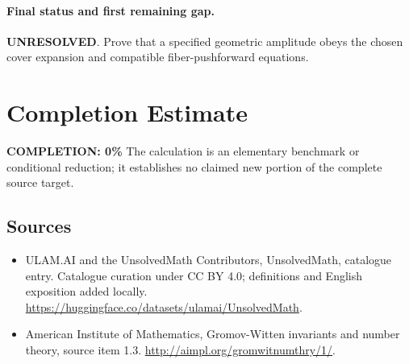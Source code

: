 \documentclass[11pt]{article}
\begin{document}
\paragraph{Final status and first remaining gap.}
\textbf{UNRESOLVED}. Prove that a specified geometric amplitude obeys the chosen cover expansion and compatible fiber-pushforward equations.

\section{Completion Estimate}
\noindent\textbf{COMPLETION: 0\%}
The calculation is an elementary benchmark or conditional reduction; it establishes no claimed new portion of the complete source target.

\subsection{Sources}
\begin{itemize}
\item[\hypertarget{source:statement:1}{S1}] ULAM.AI and the UnsolvedMath Contributors, UnsolvedMath, catalogue entry. Catalogue curation under CC BY 4.0; definitions and English exposition added locally.
\url{https://huggingface.co/datasets/ulamai/UnsolvedMath}.
\item[\hypertarget{source:statement:2}{S2}] American Institute of Mathematics, Gromov-Witten invariants and number theory, source item 1.3.
\url{http://aimpl.org/gromwitnumthry/1/}.
\end{itemize}
\label{end:statement}
\end{document}
